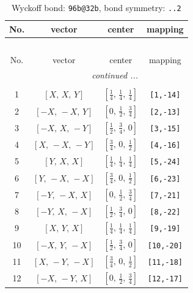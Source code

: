 \documentclass[fleqn,8pt]{jsarticle}
\begin{document}
\begin{longtable}{cccc}
\caption{Wyckoff bond: {\tt 96b@32b}, bond symmetry: {\tt ..2}}
 \\
 \hline \hline
No. & vector & center & mapping \\ \hline \endfirsthead

\multicolumn{3}{l}{\tablename\ \thetable{}} \\
 \hline \hline
No. & vector & center & mapping \\ \hline \endhead

 \hline \hline
\multicolumn{3}{r}{\footnotesize\it continued ...} \\ \endfoot

 \hline \hline
\multicolumn{3}{r}{} \\ \endlastfoot

1 & $\left[ X,\, X,\, Y \right]$ & $\left[ \frac{1}{4},\, \frac{1}{4},\, \frac{1}{4} \right]$ & {\tt [1,-14]} \\ \hline
2 & $\left[ - X,\, - X,\, Y \right]$ & $\left[ 0,\, \frac{1}{2},\, \frac{3}{4} \right]$ & {\tt [2,-13]} \\ \hline
3 & $\left[ - X,\, X,\, - Y \right]$ & $\left[ \frac{1}{2},\, \frac{3}{4},\, 0 \right]$ & {\tt [3,-15]} \\ \hline
4 & $\left[ X,\, - X,\, - Y \right]$ & $\left[ \frac{3}{4},\, 0,\, \frac{1}{2} \right]$ & {\tt [4,-16]} \\ \hline
5 & $\left[ Y,\, X,\, X \right]$ & $\left[ \frac{1}{4},\, \frac{1}{4},\, \frac{1}{4} \right]$ & {\tt [5,-24]} \\ \hline
6 & $\left[ Y,\, - X,\, - X \right]$ & $\left[ \frac{3}{4},\, 0,\, \frac{1}{2} \right]$ & {\tt [6,-23]} \\ \hline
7 & $\left[ - Y,\, - X,\, X \right]$ & $\left[ 0,\, \frac{1}{2},\, \frac{3}{4} \right]$ & {\tt [7,-21]} \\ \hline
8 & $\left[ - Y,\, X,\, - X \right]$ & $\left[ \frac{1}{2},\, \frac{3}{4},\, 0 \right]$ & {\tt [8,-22]} \\ \hline
9 & $\left[ X,\, Y,\, X \right]$ & $\left[ \frac{1}{4},\, \frac{1}{4},\, \frac{1}{4} \right]$ & {\tt [9,-19]} \\ \hline
10 & $\left[ - X,\, Y,\, - X \right]$ & $\left[ \frac{1}{2},\, \frac{3}{4},\, 0 \right]$ & {\tt [10,-20]} \\ \hline
11 & $\left[ X,\, - Y,\, - X \right]$ & $\left[ \frac{3}{4},\, 0,\, \frac{1}{2} \right]$ & {\tt [11,-18]} \\ \hline
12 & $\left[ - X,\, - Y,\, X \right]$ & $\left[ 0,\, \frac{1}{2},\, \frac{3}{4} \right]$ & {\tt [12,-17]} \\ \hline

\end{longtable}
\end{document}
